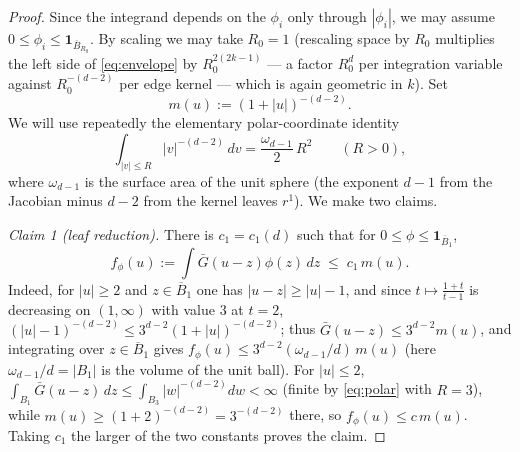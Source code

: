 \documentclass[10pt,a4paper]{amsart}
\begin{document}
\begin{proof}
Since the integrand depends on the $\phi_i$ only through $|\phi_i|$, we may assume $0\le\phi_i\le\mathbf 1_{\overline B_{R_0}}$. By scaling we may take $R_0=1$ (rescaling space by
$R_0$ multiplies the left side of \eqref{eq:envelope} by $R_0^{2(2k-1)}$ ---
a factor $R_0^{d}$ per integration variable against $R_0^{-(d-2)}$ per edge
kernel --- which is again geometric in $k$). Set
\[
m(u):=(1+|u|)^{-(d-2)} .
\]
We will use repeatedly the elementary polar-coordinate identity
\begin{equation}\label{eq:polar}
\int_{|v|\le R}|v|^{-(d-2)}\,dv=\frac{\omega_{d-1}}{2}\,R^2
\qquad(R>0),
\end{equation}
where $\omega_{d-1}$ is the surface area of the unit sphere (the exponent
$d-1$ from the Jacobian minus $d-2$ from the kernel leaves $r^1$).
We make two claims.

\emph{Claim 1 (leaf reduction).} There is $c_1=c_1(d)$ such that for
$0\le\phi\le\mathbf 1_{\overline B_1}$,
\[
f_\phi(u):=\int\bar G(u-z)\phi(z)\,dz\;\le\;c_1\,m(u).
\]
Indeed, for $|u|\ge2$ and $z\in\overline B_1$ one has $|u-z|\ge|u|-1$, and
since $t\mapsto\frac{1+t}{t-1}$ is decreasing on $(1,\infty)$ with value $3$
at $t=2$, $(|u|-1)^{-(d-2)}\le 3^{d-2}(1+|u|)^{-(d-2)}$; thus
$\bar G(u-z)\le 3^{d-2}m(u)$, and integrating over $z\in\overline B_1$
gives $f_\phi(u)\le 3^{d-2}(\omega_{d-1}/d)\,m(u)$ (here $\omega_{d-1}/d=|B_1|$ is the volume of the unit ball). For $|u|\le2$,
$\int_{B_1}\bar G(u-z)\,dz\le\int_{B_3}|w|^{-(d-2)}dw<\infty$ (finite
by \eqref{eq:polar} with $R=3$), while $m(u)\ge(1+2)^{-(d-2)}=3^{-(d-2)}$
there, so $f_\phi(u)\le c\,m(u)$. Taking $c_1$ the larger of the two constants
proves the claim.


\end{proof}
\end{document}
